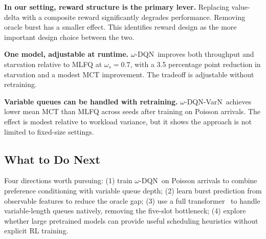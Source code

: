 \documentclass[10pt,twocolumn]{article}
\theoremstyle{remark}
\newcommand{\omegadqn}{$\omega$-DQN}
\newcommand{\omegavarn}{$\omega$-DQN-VarN}
\begin{document}
\textbf{In our setting, reward structure is the primary lever.}
Replacing value-delta with a composite reward significantly degrades
performance. Removing oracle burst has a smaller effect. This
identifies reward design as the more important design choice between
the two.

\textbf{One model, adjustable at runtime.} \omegadqn\ improves both
throughput and starvation relative to MLFQ at $\omega_s=0.7$, with a
3.5 percentage point reduction in starvation and a modest MCT
improvement. The tradeoff is adjustable without retraining.

\textbf{Variable queues can be handled with retraining.} \omegavarn\
achieves lower mean MCT than MLFQ across seeds after training on
Poisson arrivals. The effect is modest relative to workload variance,
but it shows the approach is not limited to fixed-size settings.

\subsection*{What to Do Next}

Four directions worth pursuing: (1) train \omegadqn\ on Poisson
arrivals to combine preference conditioning with variable queue
depth; (2) learn burst prediction from observable features to reduce
the oracle gap; (3) use a full transformer~\cite{vaswani2017} to
handle variable-length queues natively, removing the five-slot
bottleneck; (4) explore whether large pretrained models can provide
useful scheduling heuristics without explicit RL training.
\end{document}

